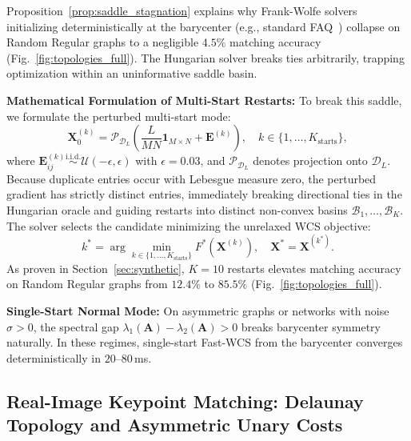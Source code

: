 \documentclass[conference]{IEEEtran}
\begin{document}
Proposition~\ref{prop:saddle_stagnation} explains why Frank-Wolfe solvers initializing deterministically at the barycenter (e.g., standard FAQ~\cite{vogelstein2015fast}) collapse on Random Regular graphs to a negligible $4.5\%$ matching accuracy (Fig.~\ref{fig:topologies_full}). The Hungarian solver breaks ties arbitrarily, trapping optimization within an uninformative saddle basin.

\textbf{Mathematical Formulation of Multi-Start Restarts:} To break this saddle, we formulate the perturbed multi-start mode:
\begin{equation}
\mathbf{X}_0^{(k)} = \mathcal{P}_{\mathcal{D}_L}\left( \frac{L}{MN} \mathbf{1}_{M \times N} + \mathbf{E}^{(k)} \right), \quad k \in \{1, \ldots, K_{\text{starts}}\},
\label{eq:perturbed_seed}
\end{equation}
where $\mathbf{E}_{ij}^{(k)} \overset{\text{i.i.d.}}{\sim} \mathcal{U}(-\epsilon, \epsilon)$ with $\epsilon = 0.03$, and $\mathcal{P}_{\mathcal{D}_L}$ denotes projection onto $\mathcal{D}_L$. Because duplicate entries occur with Lebesgue measure zero, the perturbed gradient has strictly distinct entries, immediately breaking directional ties in the Hungarian oracle and guiding restarts into distinct non-convex basins $\mathcal{B}_1, \ldots, \mathcal{B}_K$. The solver selects the candidate minimizing the unrelaxed WCS objective:
\begin{equation}
k^* = \arg\min_{k \in \{1, \ldots, K_{\text{starts}}\}} F^*(\mathbf{X}^{(k)}), \quad \mathbf{X}^* = \mathbf{X}^{(k^*)}.
\label{eq:restart_tournament}
\end{equation}
As proven in Section~\ref{sec:synthetic}, $K=10$ restarts elevates matching accuracy on Random Regular graphs from $12.4\%$ to $85.5\%$ (Fig.~\ref{fig:topologies_full}).

\textbf{Single-Start Normal Mode:} On asymmetric graphs or networks with noise $\sigma > 0$, the spectral gap $\lambda_1(\mathbf{A}) - \lambda_2(\mathbf{A}) > 0$ breaks barycenter symmetry naturally. In these regimes, single-start Fast-WCS from the barycenter converges deterministically in $20\text{--}80$\,ms.

\subsection{Real-Image Keypoint Matching: Delaunay Topology and Asymmetric Unary Costs}
\label{subsec:domain_image}
\end{document}
